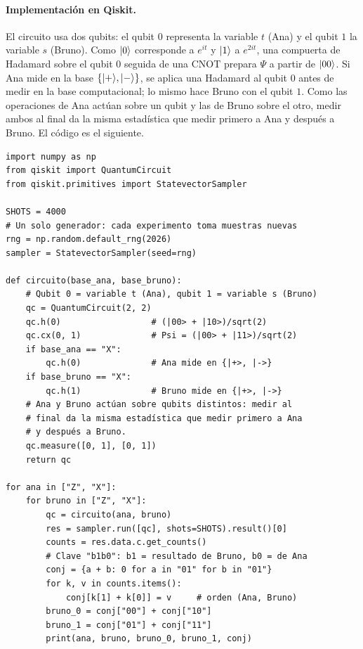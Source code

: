\paragraph{Implementación en Qiskit.} El circuito usa dos qubits: el qubit $0$ representa la variable $t$ (Ana) y el qubit $1$ la variable $s$ (Bruno). Como $\lvert 0\rangle$ corresponde a $e^{it}$ y $\lvert 1\rangle$ a $e^{2it}$, una compuerta de Hadamard sobre el qubit $0$ seguida de una CNOT prepara $\Psi$ a partir de $\lvert 00\rangle$. Si Ana mide en la base $\{\lvert +\rangle,\lvert -\rangle\}$, se aplica una Hadamard al qubit $0$ antes de medir en la base computacional; lo mismo hace Bruno con el qubit $1$. Como las operaciones de Ana actúan sobre un qubit y las de Bruno sobre el otro, medir ambos al final da la misma estadística que medir primero a Ana y después a Bruno. El código es el siguiente.
\begin{verbatim}
import numpy as np
from qiskit import QuantumCircuit
from qiskit.primitives import StatevectorSampler

SHOTS = 4000
# Un solo generador: cada experimento toma muestras nuevas
rng = np.random.default_rng(2026)
sampler = StatevectorSampler(seed=rng)

def circuito(base_ana, base_bruno):
    # Qubit 0 = variable t (Ana), qubit 1 = variable s (Bruno)
    qc = QuantumCircuit(2, 2)
    qc.h(0)                  # (|00> + |10>)/sqrt(2)
    qc.cx(0, 1)              # Psi = (|00> + |11>)/sqrt(2)
    if base_ana == "X":
        qc.h(0)              # Ana mide en {|+>, |->}
    if base_bruno == "X":
        qc.h(1)              # Bruno mide en {|+>, |->}
    # Ana y Bruno actúan sobre qubits distintos: medir al
    # final da la misma estadística que medir primero a Ana
    # y después a Bruno.
    qc.measure([0, 1], [0, 1])
    return qc

for ana in ["Z", "X"]:
    for bruno in ["Z", "X"]:
        qc = circuito(ana, bruno)
        res = sampler.run([qc], shots=SHOTS).result()[0]
        counts = res.data.c.get_counts()
        # Clave "b1b0": b1 = resultado de Bruno, b0 = de Ana
        conj = {a + b: 0 for a in "01" for b in "01"}
        for k, v in counts.items():
            conj[k[1] + k[0]] = v     # orden (Ana, Bruno)
        bruno_0 = conj["00"] + conj["10"]
        bruno_1 = conj["01"] + conj["11"]
        print(ana, bruno, bruno_0, bruno_1, conj)
\end{verbatim}

